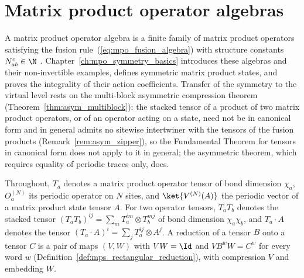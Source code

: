 
\chapter{Matrix product operator algebras}%
\label{ch:mpo_algebras}

A matrix product operator algebra is a finite family of matrix product
operators satisfying the fusion rule~(\ref{eq:mpo_fusion_algebra}) with
structure constants $N_{ab}^c\in\N$
\cite{Bultinck2017Anyons,GarreRubio2023MPOSym,Molnar2022MPOAlgebrasI}.
Chapter~\ref{ch:mpo_symmetry_basics} introduces these algebras and their
non-invertible examples, defines symmetric matrix product states, and proves
the integrality of their action coefficients.
Transfer of the symmetry to the virtual level rests on the multi-block
asymmetric compression theorem (Theorem~\ref{thm:asym_multiblock}): the stacked
tensor of a product of two matrix product operators, or of an operator acting
on a state, need not be in canonical form and in general admits no sitewise
intertwiner with the tensors of the fusion products
(Remark~\ref{rem:asym_zipper}), so the Fundamental Theorem for tensors in
canonical form does not apply to it in general; the asymmetric theorem, which
requires equality of periodic traces only, does.

Throughout, $T_a$ denotes a matrix product operator tensor of bond dimension
$\chi_a$, $O_a^{(N)}$ its periodic operator on $N$ sites, and
$\ket{V^{(N)}(A)}$ the periodic vector of a matrix product state tensor $A$.
For two operator tensors, $T_aT_b$ denotes the stacked tensor
$(T_aT_b)^{ij}=\sum_mT_a^{im}\otimes T_b^{mj}$ of bond dimension
$\chi_a\chi_b$, and $T_a\cdot A$ denotes the tensor
$(T_a\cdot A)^i=\sum_jT_a^{ij}\otimes A^j$. A reduction of a tensor $B$ onto a
tensor $C$ is a pair of maps $(V,W)$ with $VW=\Id$ and $VB^wW=C^w$ for every
word $w$ (Definition~\ref{def:mps_rectangular_reduction}), with compression $V$
and embedding $W$.

